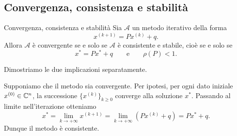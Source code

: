 \documentclass[a4paper]{article}
\begin{document}
\subsection{Convergenza, consistenza e stabilità}

\begin{snippettheorem}{Convergenza, consistenza e stabilità}
    Sia \(\mathcal{A}\) un metodo iterativo della forma
    \[
        x^{(k+1)} = Px^{(k)}+q.
    \]
    Allora \(\mathcal{A}\) è convergente se e solo se \(\mathcal{A}\) è consistente e stabile, cioè se e solo se
    \[
        x^\ast = Px^\ast+q
        \qquad\text{e}\qquad
        \rho(P)<1.
    \]
\end{snippettheorem}

\begin{snippetproof}{}
    Dimostriamo le due implicazioni separatamente.

    \begin{iffproof}
    \item Supponiamo che il metodo sia convergente. Per ipotesi, per ogni dato iniziale
        \(x^{(0)}\in\mathbb{C}^n\), la successione \(\{x^{(k)}\}_{k\geq 0}\) converge alla soluzione
        \(x^\ast\). Passando al limite nell'iterazione otteniamo
        \[
            x^\ast
            =
            \lim_{k\to+\infty}x^{(k+1)}
            =
            \lim_{k\to+\infty}\left(Px^{(k)}+q\right)
            =
            Px^\ast+q.
        \]
        Dunque il metodo è consistente.


\end{iffproof}
\end{snippetproof}
\end{document}
